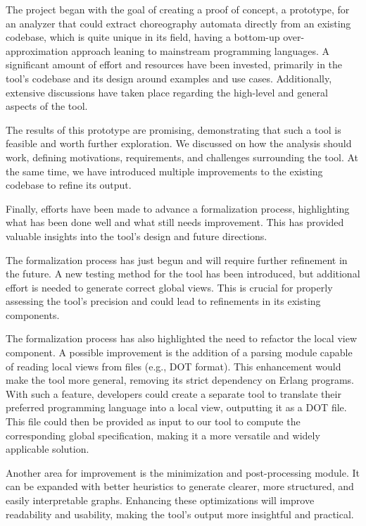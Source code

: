 The project began with the goal of creating a proof of concept, a prototype,  
for an analyzer that could extract choreography automata directly
from an existing codebase, which is quite unique in its field,
having a bottom-up over-approximation approach leaning to mainstream
programming languages.  
A significant amount of effort and resources have been invested,  
primarily in the tool's codebase and its design around examples and  
use cases. Additionally, extensive discussions have taken place  
regarding the high-level and general aspects of the tool.  

The results of this prototype are promising, demonstrating that such  
a tool is feasible and worth further exploration.  
We discussed on how the analysis should work, defining motivations,  
requirements, and challenges surrounding the tool. At the same time,  
we have introduced multiple improvements to the existing codebase to  
refine its output.  

Finally, efforts have been made to advance a formalization process,  
highlighting what has been done well and what still needs  
improvement. This has provided valuable insights into the tool’s  
design and future directions.  

The formalization process has just begun and will require further refinement  
in the future. A new testing method for the tool has been introduced, but  
additional effort is needed to generate correct global views. This is  
crucial for properly assessing the tool's precision and could lead to  
refinements in its existing components.  

The formalization process has also highlighted the need to refactor the  
local view component. A possible improvement is the addition of a parsing  
module capable of reading local views from files (e.g., DOT format).  
This enhancement would make the tool more general, removing its strict  
dependency on Erlang programs. 
With such a feature, developers could create a separate tool to translate  
their preferred programming language into a local view, outputting it  
as a DOT file. This file could then be provided as input to our tool  
to compute the corresponding global specification, making it a more  
versatile and widely applicable solution.  

Another area for improvement is the minimization and post-processing  
module. It can be expanded with better heuristics to generate clearer,  
more structured, and easily interpretable graphs. Enhancing these  
optimizations will improve readability and usability, making the tool’s  
output more insightful and practical.
